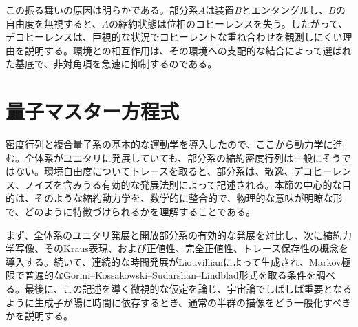 \documentclass[a4paper,11pt,oneside]{article}
\theoremstyle{definition}
\numberwithin{equation}{section}
\begin{document}
この振る舞いの原因は明らかである。部分系$A$は装置$B$とエンタングルし、$B$の自由度を無視すると、$A$の縮約状態は位相のコヒーレンスを失う。したがって、デコヒーレンスは、巨視的な状況でコヒーレントな重ね合わせを観測しにくい理由を説明する。環境との相互作用は、その環境への支配的な結合によって選ばれた基底で、非対角項を急速に抑制するのである。





\section{量子マスター方程式}\label{sec:2}



密度行列と複合量子系の基本的な運動学を導入したので、ここから動力学に進む。全体系がユニタリに発展していても、部分系の縮約密度行列は一般にそうではない。環境自由度についてトレースを取ると、部分系は、散逸、デコヒーレンス、ノイズを含みうる有効的な発展法則によって記述される。本節の中心的な目的は、そのような縮約動力学を、数学的に整合的で、物理的な意味が明瞭な形で、どのように特徴づけられるかを理解することである。



まず、全体系のユニタリ発展と開放部分系の有効的な発展を対比し、次に縮約力学写像、そのKraus表現、および正値性、完全正値性、トレース保存性の概念を導入する。続いて、連続的な時間発展がLiouvillianによって生成され、Markov極限で普遍的なGorini--Kossakowski--Sudarshan--Lindblad形式を取る条件を調べる。最後に、この記述を導く微視的な仮定を論じ、宇宙論でしばしば重要となるように生成子が陽に時間に依存するとき、通常の半群の描像をどう一般化すべきかを説明する。





 
\end{document}
